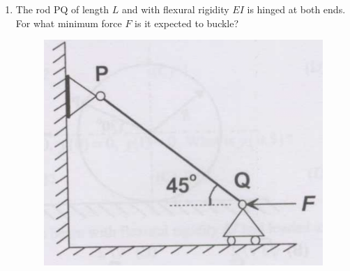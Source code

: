 \documentclass[journal,12pt,onecolumn]{IEEEtran}
\begin{document}
\begin{enumerate}[resume]
          \begin{enumerate}
          \end{enumerate}

    \item The rod PQ of length $L$ and with flexural rigidity $EI$ is hinged at both ends. For what minimum force $F$ is it expected to buckle?
          \begin{figure}[H]
              \centering
              \includegraphics[scale=0.3]{q36}
              \caption{}
              \label{q36}
          \end{figure}

          \begin{enumerate}
          \end{enumerate}


\end{enumerate}
\end{document}
